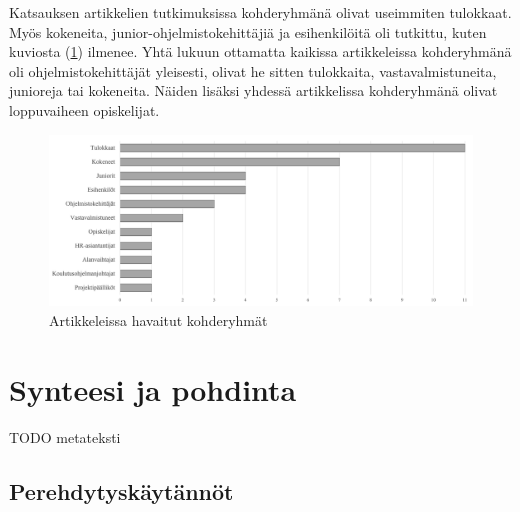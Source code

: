 \documentclass[utf8]{gradu3}
\begin{document}
Katsauksen artikkelien tutkimuksissa kohderyhmänä olivat useimmiten tulokkaat. Myös kokeneita, junior-ohjelmistokehittäjiä ja esihenkilöitä oli tutkittu, kuten kuviosta (\ref{kuvio:kohderyhmat}) ilmenee. Yhtä lukuun ottamatta kaikissa artikkeleissa kohderyhmänä oli ohjelmistokehittäjät yleisesti, olivat he sitten tulokkaita, vastavalmistuneita, junioreja tai kokeneita. Näiden lisäksi yhdessä artikkelissa kohderyhmänä olivat loppuvaiheen opiskelijat.

\begin{figure}[h]
    \centering
    \includegraphics[width=\textwidth]{media/kohderyhmat.png}
    \caption{Artikkeleissa havaitut kohderyhmät}
    \label{kuvio:kohderyhmat}
\end{figure}

\chapter{Synteesi ja pohdinta}

TODO metateksti

\section{Perehdytyskäytännöt}
\end{document}
